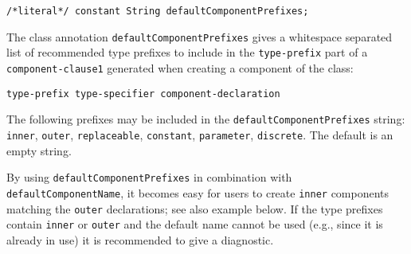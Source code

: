 \begin{annotationdefinition}[defaultComponentPrefixes]
\begin{synopsis}\begin{lstlisting}
/*literal*/ constant String defaultComponentPrefixes;
\end{lstlisting}\end{synopsis}
\begin{semantics}
The class annotation \lstinline!defaultComponentPrefixes! gives a whitespace separated list of recommended type prefixes to include in the \lstinline[language=grammar]!type-prefix! part of a \lstinline[language=grammar]!component-clause1! generated when creating a component of the class:
\begin{lstlisting}[language=grammar]
type-prefix type-specifier component-declaration
\end{lstlisting}

The following prefixes may be included in the \lstinline!defaultComponentPrefixes! string: \lstinline!inner!, \lstinline!outer!, \lstinline!replaceable!, \lstinline!constant!, \lstinline!parameter!, \lstinline!discrete!.
The default is an empty string.

\begin{nonnormative}
By using \lstinline!defaultComponentPrefixes! in combination with \lstinline!defaultComponentName!, it becomes easy for users to create \lstinline!inner! components matching the \lstinline!outer! declarations; see also example below.
If the type prefixes contain \lstinline!inner! or \lstinline!outer! and the default name cannot be used (e.g., since it is already in use) it is recommended to give a diagnostic.
\end{nonnormative}
\end{semantics}
\end{annotationdefinition}

